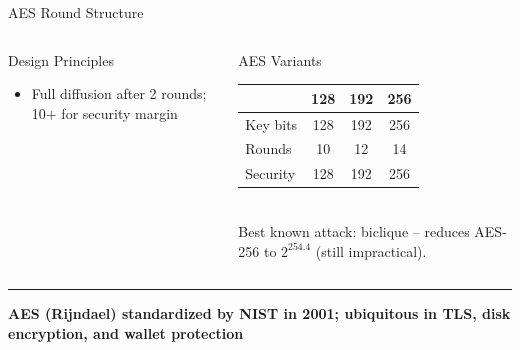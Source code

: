 \documentclass[8pt,aspectratio=169]{beamer}
\newcommand{\bottomnote}[1]{\vfill\vspace{-2mm}\textcolor{mllavender2}{\rule{\textwidth}{0.4pt}}\vspace{1mm}\footnotesize\textbf{#1}}
\begin{document}
\begin{frame}{AES Round Structure}
\begin{columns}
\begin{block}{Design Principles}
\begin{itemize}
  \item Full diffusion after 2 rounds; 10+ for security margin
\end{itemize}
\end{block}
\begin{block}{AES Variants}
\small
\begin{tabular}{lccc}
\toprule
& \textbf{128} & \textbf{192} & \textbf{256} \\
\midrule
Key bits & 128 & 192 & 256 \\
Rounds & 10 & 12 & 14 \\
Security & 128 & 192 & 256 \\
\bottomrule
\end{tabular}
\vspace{2mm}\\
\scriptsize Best known attack: biclique -- reduces AES-256 to $2^{254.4}$ (still impractical).
\end{block}
\end{columns}
\bottomnote{AES (Rijndael) standardized by NIST in 2001; ubiquitous in TLS, disk encryption, and wallet protection}
\end{frame}
\end{document}
